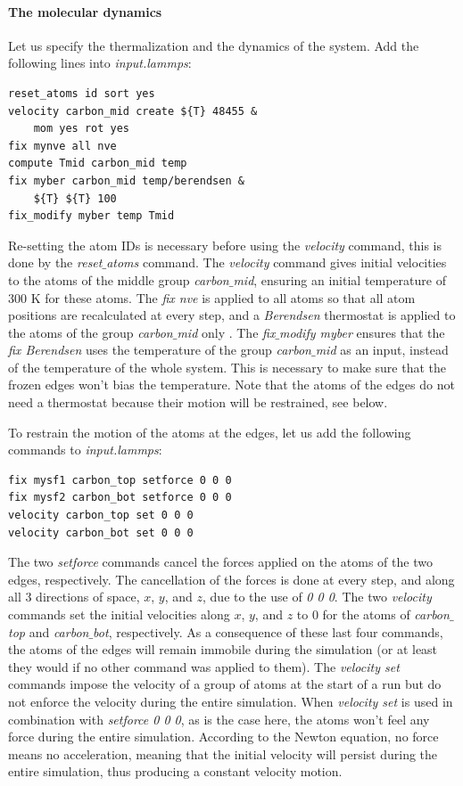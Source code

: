 \documentclass[9pt,tutorial]{livecoms}
\begin{document}
\paragraph{The molecular dynamics}
Let us specify the thermalization and the dynamics of the system. Add the following lines into \textit{input.lammps}:
{\normalsize \begin{verbatim}
reset_atoms id sort yes
velocity carbon_mid create ${T} 48455 &
    mom yes rot yes
fix mynve all nve
compute Tmid carbon_mid temp
fix myber carbon_mid temp/berendsen &
    ${T} ${T} 100
fix_modify myber temp Tmid
\end{verbatim}}
Re-setting the atom IDs is necessary before using the \textit{velocity} command, this is done by the \textit{reset$\_$atoms} command. The \textit{velocity} command gives initial velocities to the atoms of the middle group \textit{carbon$\_$mid}, ensuring an initial temperature of 300 K for these atoms. The \textit{fix nve} is applied to all atoms so that all atom positions are recalculated at every step, and a \textit{Berendsen} thermostat is applied to the atoms of the group \textit{carbon$\_$mid} only \cite{berendsen1984molecular}. The \textit{fix$\_$modify myber} ensures that the \textit{fix Berendsen} uses the temperature of the group \textit{carbon$\_$mid} as an input, instead of the temperature of the whole system. This is necessary to make sure that the frozen edges won't bias the temperature. Note that the atoms of the edges do not need a thermostat because their motion will be restrained, see below.

To restrain the motion of the atoms at the edges, let us add the following commands to \textit{input.lammps}:
{\normalsize \begin{verbatim}
fix mysf1 carbon_top setforce 0 0 0
fix mysf2 carbon_bot setforce 0 0 0
velocity carbon_top set 0 0 0
velocity carbon_bot set 0 0 0
\end{verbatim}}
The two \textit{setforce} commands cancel the forces applied on the atoms of the two edges, respectively. The cancellation of the forces is done at every step, and along all 3 directions of space, $x$, $y$, and $z$, due to the use of \textit{0 0 0}. The two \textit{velocity} commands set the initial velocities along $x$, $y$, and $z$ to 0 for the atoms of \textit{carbon$\_$top} and \textit{carbon$\_$bot}, respectively. As a consequence of these last four commands, the atoms of the edges will remain immobile during the simulation (or at least they would if no other command was applied to them). The \textit{velocity set} commands impose the velocity of a group of atoms at the start of a run but do not enforce the velocity during the entire simulation. When \textit{velocity set} is used in combination with \textit{setforce 0 0 0}, as is the case here, the atoms won't feel any force during the entire simulation. According to the Newton equation, no force means no acceleration, meaning that the initial velocity will persist during the entire simulation, thus producing a constant velocity motion.
\end{document}
